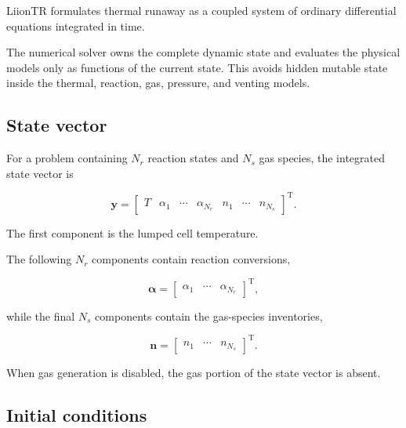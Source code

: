 LiionTR formulates thermal runaway as a coupled system of ordinary
differential equations integrated in time.

The numerical solver owns the complete dynamic state and evaluates the
physical models only as functions of the current state. This avoids
hidden mutable state inside the thermal, reaction, gas, pressure, and
venting models.


\subsection{State vector}

For a problem containing $N_r$ reaction states and $N_s$ gas species,
the integrated state vector is

\begin{equation}
    \mathbf{y}
    =
    \begin{bmatrix}
        T &
        \alpha_1 &
        \cdots &
        \alpha_{N_r} &
        n_1 &
        \cdots &
        n_{N_s}
    \end{bmatrix}^{\mathrm{T}}.
    \label{eq:numerical_state_vector}
\end{equation}

The first component is the lumped cell temperature.

The following $N_r$ components contain reaction conversions,

\begin{equation}
    \boldsymbol{\alpha}
    =
    \begin{bmatrix}
        \alpha_1 &
        \cdots &
        \alpha_{N_r}
    \end{bmatrix}^{\mathrm{T}},
\end{equation}

while the final $N_s$ components contain the gas-species inventories,

\begin{equation}
    \mathbf{n}
    =
    \begin{bmatrix}
        n_1 &
        \cdots &
        n_{N_s}
    \end{bmatrix}^{\mathrm{T}}.
\end{equation}

When gas generation is disabled, the gas portion of the state vector is
absent.


\subsection{Initial conditions}

